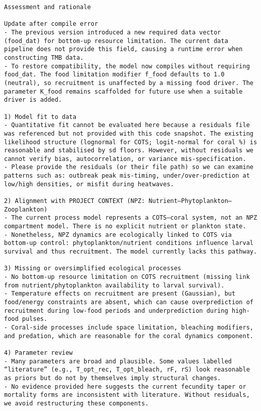 \begin{lstlisting}
Assessment and rationale

Update after compile error
- The previous version introduced a new required data vector (food_dat) for bottom-up resource limitation. The current data pipeline does not provide this field, causing a runtime error when constructing TMB data.
- To restore compatibility, the model now compiles without requiring food_dat. The food limitation modifier f_food defaults to 1.0 (neutral), so recruitment is unaffected by a missing food driver. The parameter K_food remains scaffolded for future use when a suitable driver is added.

1) Model fit to data
- Quantitative fit cannot be evaluated here because a residuals file was referenced but not provided with this code snapshot. The existing likelihood structure (lognormal for COTS; logit-normal for coral %) is reasonable and stabilised by sd floors. However, without residuals we cannot verify bias, autocorrelation, or variance mis-specification.
- Please provide the residuals (or their file path) so we can examine patterns such as: outbreak peak mis-timing, under/over-prediction at low/high densities, or misfit during heatwaves.

2) Alignment with PROJECT CONTEXT (NPZ: Nutrient–Phytoplankton–Zooplankton)
- The current process model represents a COTS–coral system, not an NPZ compartment model. There is no explicit nutrient or plankton state.
- Nonetheless, NPZ dynamics are ecologically linked to COTS via bottom-up control: phytoplankton/nutrient conditions influence larval survival and thus recruitment. The model currently lacks this pathway.

3) Missing or oversimplified ecological processes
- No bottom-up resource limitation on COTS recruitment (missing link from nutrient/phytoplankton availability to larval survival).
- Temperature effects on recruitment are present (Gaussian), but food/energy constraints are absent, which can cause overprediction of recruitment during low-food periods and underprediction during high-food pulses.
- Coral-side processes include space limitation, bleaching modifiers, and predation, which are reasonable for the coral dynamics component.

4) Parameter review
- Many parameters are broad and plausible. Some values labelled “literature” (e.g., T_opt_rec, T_opt_bleach, rF, rS) look reasonable as priors but do not by themselves imply structural changes.
- No evidence provided here suggests the current fecundity taper or mortality forms are inconsistent with literature. Without residuals, we avoid restructuring these components.


\end{lstlisting}
